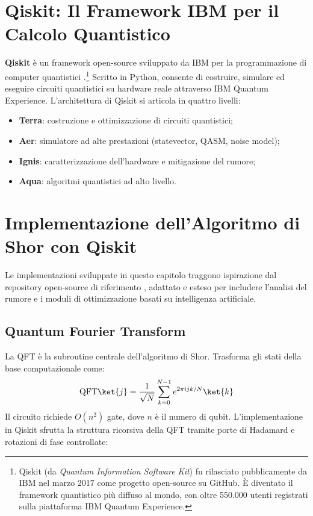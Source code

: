 \begin{onehalfspace}

\section{Qiskit: Il Framework IBM per il Calcolo Quantistico}

\textbf{Qiskit} è un framework open-source sviluppato da \ac{IBM} per la programmazione di computer quantistici \cite{qiskit2023}.\footnote{Qiskit (da \textit{Quantum Information Software Kit}) fu rilasciato pubblicamente da IBM nel marzo 2017 come progetto open-source su GitHub. È diventato il framework quantistico più diffuso al mondo, con oltre 550.000 utenti registrati sulla piattaforma IBM Quantum Experience.} Scritto in Python, consente di costruire, simulare ed eseguire circuiti quantistici su hardware reale attraverso IBM Quantum Experience. L'architettura di Qiskit si articola in quattro livelli:
\begin{itemize}
    \item \textbf{Terra}: costruzione e ottimizzazione di circuiti quantistici;
    \item \textbf{Aer}: simulatore ad alte prestazioni (statevector, QASM, noise model);
    \item \textbf{Ignis}: caratterizzazione dell'hardware e mitigazione del rumore;
    \item \textbf{Aqua}: algoritmi quantistici ad alto livello.
\end{itemize}

\section{Implementazione dell'Algoritmo di Shor con Qiskit}

Le implementazioni sviluppate in questo capitolo traggono ispirazione dal repository open-source di riferimento \cite{github_shor}, adattato e esteso per includere l'analisi del rumore e i moduli di ottimizzazione basati su intelligenza artificiale.

\subsection{Quantum Fourier Transform}

La \acf{QFT} è la subroutine centrale dell'algoritmo di Shor. Trasforma gli stati della base computazionale come:
\begin{equation}
    \text{QFT}\ket{j} = \frac{1}{\sqrt{N}} \sum_{k=0}^{N-1} e^{2\pi i jk/N} \ket{k}
\end{equation}
Il circuito richiede $O(n^2)$ gate, dove $n$ è il numero di qubit. L'implementazione in Qiskit sfrutta la struttura ricorsiva della QFT tramite porte di Hadamard e rotazioni di fase controllate:


\end{onehalfspace}
